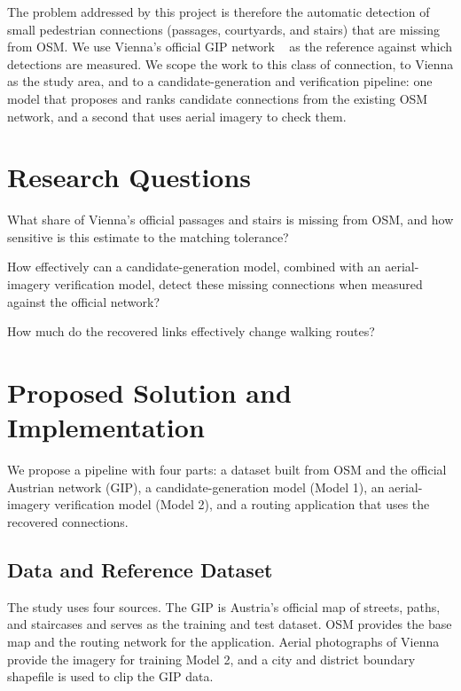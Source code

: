 \documentclass[conference]{IEEEtran}
\begin{document}
The problem addressed by this project is therefore the automatic detection of small pedestrian connections (passages, courtyards, and stairs) that are missing from OSM. We use Vienna's official GIP network ~\cite{gipdocs} as the reference against which detections are measured. We scope the work to this class of connection, to Vienna as the study area, and to a candidate-generation and verification pipeline: one model that proposes and ranks candidate connections from the existing OSM network, and a second that uses aerial imagery to check them.


\section{Research Questions}

What share of Vienna's official passages and stairs is missing from OSM, and how sensitive is this estimate to the matching tolerance?

How effectively can a candidate-generation model, combined with an aerial-imagery verification model, detect these missing connections when measured against the official network? 

How much do the recovered links effectively change walking routes?


\section{Proposed Solution and Implementation}

We propose a pipeline with four parts: a dataset built from OSM and the official Austrian network (GIP), a candidate-generation model (Model 1), an aerial-imagery verification model (Model 2), and a routing application that uses the recovered connections.

\subsection{Data and Reference Dataset}

The study uses four sources. The GIP \cite{gipdocs} is Austria's official map of streets, paths, and staircases and serves as the training and test dataset. OSM provides the base map and the routing network for the application. Aerial photographs of Vienna provide the imagery for training Model 2, and a city and district boundary shapefile is used to clip the GIP data.
\end{document}
